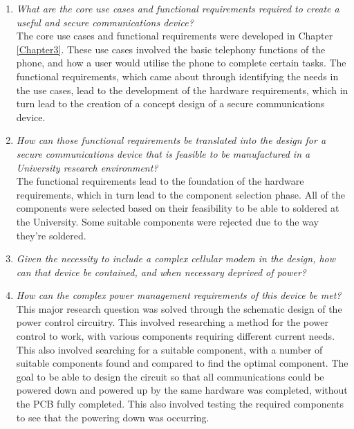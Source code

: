 \begin{enumerate}
\item \textit{What are the core use cases and functional requirements required to create a useful and secure communications device?}\\

	The core use cases and functional requirements were developed in Chapter \ref{Chapter3}. 
These use cases involved the basic telephony functions of the phone, and how a user would utilise the phone to complete certain tasks. 
The functional requirements, which came about through identifying the needs in the use cases, lead to the development of the hardware requirements, which in turn lead to the creation of a concept design of a secure communications device.\\

\item \textit{How can those functional requirements be translated into the design for a secure communications device that is feasible to be manufactured in a University research environment?}\\

	The functional requirements lead to the foundation of the hardware requirements, which in turn lead to the component selection phase. 
All of the components were selected based on their feasibility to be able to soldered at the University.
Some suitable components were rejected due to the way they're soldered.\\

\item \textit{Given the necessity to include a complex cellular modem in the design, how can that device be contained, and when necessary deprived of power?}\\

	

\item \textit{How can the complex power management requirements of this device be met?}\\

	This major research question was solved through the schematic design of the power control circuitry. 
This involved researching a method for the power control to work, with various components requiring different current needs. 
This also involved searching for a suitable component, with a number of suitable components found and compared to find the optimal component. The goal to be able to design the circuit so that all communications could be powered down and powered up by the same hardware was completed, without the PCB fully completed. This also involved testing the required components to see that the powering down was occurring.\\
	

\end{enumerate}
